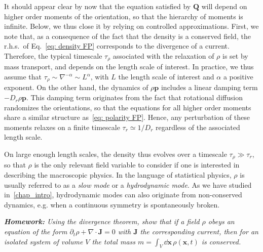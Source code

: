 It should appear clear by now that the equation satisfied by $\bm Q$ will depend on higher order moments of the orientation, so that the hierarchy of moments is infinite.
Below, we thus close it by relying on controlled approximations. 
First, we note that, as a consequence of the fact that the density is a conserved field, the r.h.s.\ of Eq.~\eqref{eq: density FP} corresponds to the divergence of a current.
Therefore, the typical timescale $\tau_\rho$ associated with the relaxation of $\rho$ is set by mass transport, and depends on the length scale of interest. 
In practice, we thus assume that $\tau_\rho \sim \nabla^{-\alpha} \sim L^\alpha$,
with $L$ the length scale of interest and $\alpha$ a positive exponent.
On the other hand, the dynamics of $\rho\bm p$ includes a linear damping term $-D_r \rho\bm p$.
This damping term originates from the fact that rotational diffusion randomizes the orientations, so that the equations for all higher order moments share a similar structure as~\eqref{eq: polarity FP}.
Hence, any perturbation of these moments relaxes on a finite timescale $\tau_r \simeq 1/D_r$ regardless of the associated length scale.

On large enough length scales,
the density thus evolves over a timescale $\tau_\rho \gg \tau_r$,
so that $\rho$ is the only relevant field variable to consider if one is interested in describing the macroscopic physics.
In the language of statistical physics, $\rho$ is usually referred to as a \emph{slow mode} or a \emph{hydrodynamic mode}.
As we have studied in~\autoref{chap_intro}, hydrodynamic modes can also originate from non-conserved dynamics, e.g. when a continuous symmetry is spontaneously broken. 

\textit{{\bf Homework:} Using the divergence theorem, show that if a field $\rho$ obeys an equation of the form $\partial_t \rho + \nabla \cdot \bm J = 0$ with $\bm J$ the corresponding current, then for an isolated system of volume $V$ the total mass $m = \int_V\dd\bm x \, \rho(\bm x,t)$ is conserved.}

